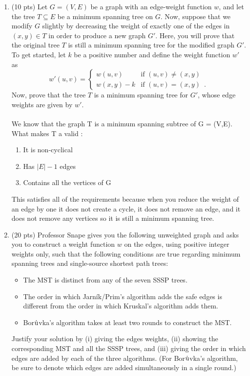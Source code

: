 \documentclass[12pt]{article}
\begin{document}
\begin{enumerate}
	\item \label{2} (10 pts) Let $G=(V,E)$ be a graph with an edge-weight function $w$, and let the tree $T\subseteq E$ be a minimum spanning tree on $G$. Now, suppose that we modify $G$ slightly by decreasing the weight of exactly one of the edges in $(x,y)\in T$ in order to produce a new graph $G'$. Here, you will prove that the original tree $T$ is still a minimum spanning tree for the modified graph $G'$. \\
	 To get started, let $k$ be a positive number and define the weight function $w'$ as
%
\begin{displaymath}
w'(u,v) = \left\{
\begin{array}{ll}
w(u,v) & \textrm{if $(u,v)\not= (x,y)$} \\
w(x,y)-k & \textrm{if $(u,v)=(x,y)$} \enspace .
\end{array}\right.
\end{displaymath}
%
Now, prove that the tree $T$ is a minimum spanning tree for $G'$, whose edge weights are given by $w'$.
	\\
	\\
	We know that the graph T is a minimum spanning subtree of G = (V,E). What makes T a valid :
\begin{enumerate}
\item It is non-cyclical 
\item Has $|E|-1$ edges
\item Contains all the vertices of G
\end{enumerate}
This satisfies all of the requirements because when you reduce the weight of an edge by one it does not create a cycle, it does not remove an edge, and it does not remove any vertices so it is still a minimum spanning tree.
		\pagebreak





	\item \label{3} (20 pts) Professor Snape gives you the following unweighted graph and asks you to construct a weight function $w$ on the edges, using positive integer weights only, such that the following conditions are true regarding minimum spanning trees and single-source shortest path trees:
	\begin{itemize}
	\itemsep-0.1pt
	\item The MST is distinct from any of the seven SSSP trees.
	\item The order in which Jarn\'ik/Prim's algorithm adds the safe edges is different from the order in which Kruskal's algorithm adds them.
	\item Bor$\rm{\dot{u}}$vka's algorithm takes at least two rounds to construct the MST.
	\end{itemize}
	Justify your solution by (i) giving the edges weights, (ii) showing the corresponding MST and all the SSSP trees, and (iii) giving the order in which edges are added by each of the three algorithms. (For Bor$\rm{\dot{u}}$vka's algorithm, be sure to denote which edges are added simultaneously in a single round.)


\end{enumerate}
\end{document}

